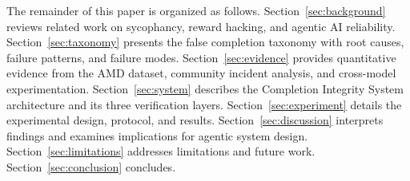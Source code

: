The remainder of this paper is organized as follows.
Section~\ref{sec:background} reviews related work on sycophancy, reward hacking, and agentic AI reliability.
Section~\ref{sec:taxonomy} presents the false completion taxonomy with root causes, failure patterns, and failure modes.
Section~\ref{sec:evidence} provides quantitative evidence from the AMD dataset, community incident analysis, and cross-model experimentation.
Section~\ref{sec:system} describes the Completion Integrity System architecture and its three verification layers.
Section~\ref{sec:experiment} details the experimental design, protocol, and results.
Section~\ref{sec:discussion} interprets findings and examines implications for agentic system design.
Section~\ref{sec:limitations} addresses limitations and future work.
Section~\ref{sec:conclusion} concludes.
